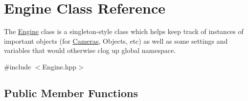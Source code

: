 \hypertarget{class_engine}{\section{Engine Class Reference}
\label{class_engine}
}


The \hyperlink{class_engine}{Engine} class is a singleton-\/style class which helps keep track of instances of important objects (for \hyperlink{class_cameras}{Cameras}, Objects, etc) as well as some settings and variables that would otherwise clog up global namespace.  




{\ttfamily \#include $<$Engine.\-hpp$>$}

\subsection*{Public Member Functions}
